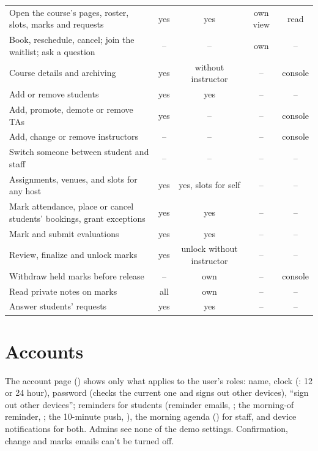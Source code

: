 {\tablefont
\begin{xltabular}{\linewidth}{@{}L c c c c@{}}
  \toprule
   &  &  &  & \\
  \midrule
  Open the course's pages, roster, slots, marks and requests & yes & yes & own view & read\\
  Book, reschedule, cancel; join the waitlist; ask a question & -- & -- & own & --\\
  Course details and archiving & yes & without instructor & -- & console\\
  Add or remove students & yes & yes & -- & --\\
  Add, promote, demote or remove TAs & yes & -- & -- & console\\
  Add, change or remove instructors & -- & -- & -- & console\\
  Switch someone between student and staff & -- & -- & -- & --\\
  Assignments, venues, and slots for any host & yes & yes, slots for self & -- & --\\
  Mark attendance, place or cancel students' bookings, grant exceptions & yes & yes & -- & --\\
  Mark and submit evaluations & yes & yes & -- & --\\
  Review, finalize and unlock marks & yes & unlock without instructor & -- & --\\
  Withdraw held marks before release & -- & own & -- & console\\
  Read private notes on marks & all & own & -- & --\\
  Answer students' requests & yes & yes & -- & --\\
  \bottomrule
\end{xltabular}}

\section{Accounts}

The account page () shows only what applies to the user's roles: name, clock (: 12 or 24 hour), password (checks the current one and signs out other devices), ``sign out other devices''; reminders for students (reminder emails, ; the morning-of reminder, ; the 10-minute push, ), the morning agenda () for staff, and device notifications for both. Admins see none of the demo settings. Confirmation, change and marks emails can't be turned off.

